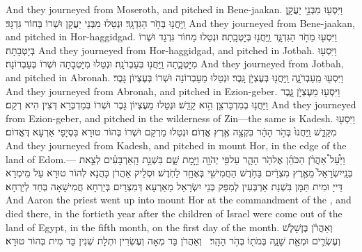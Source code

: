 {And they journeyed from Moseroth, and pitched in Bene-jaakan.}{}
{וַיִּסְע֖וּ מִבְּנֵ֣י יַעֲקָ֑ן וַֽיַּחֲנ֖וּ בְּחֹ֥ר הַגִּדְגָּֽד׃}
{וּנְטַלוּ מִבְּנֵי יַעֲקָן וּשְׁרוֹ בְּחוֹר גִּדְגָּד׃}
{And they journeyed from Bene-jaakan, and pitched in Hor-haggidgad.}{}
{וַיִּסְע֖וּ מֵחֹ֣ר הַגִּדְגָּ֑ד וַֽיַּחֲנ֖וּ בְּיׇטְבָֽתָה׃}
{וּנְטַלוּ מֵחוֹר גִּדְגָד וּשְׁרוֹ בְּיָטְבָתָה׃}
{And they journeyed from Hor-haggidgad, and pitched in Jotbah.}{}
{וַיִּסְע֖וּ מִיׇּטְבָ֑תָה וַֽיַּחֲנ֖וּ בְּעַבְרֹנָֽה׃}
{וּנְטַלוּ מִיָּטְבָתָה וּשְׁרוֹ בְּעַבְרוֹנָה׃}
{And they journeyed from Jotbah, and pitched in Abronah.}{}
{וַיִּסְע֖וּ מֵֽעַבְרֹנָ֑ה וַֽיַּחֲנ֖וּ בְּעֶצְיֹ֥ן גָּֽבֶר׃}
{וּנְטַלוּ מֵעַבְרוֹנָה וּשְׁרוֹ בְּעֶצְיוֹן גָּבֶר׃}
{And they journeyed from Abronah, and pitched in Ezion-geber.}{}
{וַיִּסְע֖וּ מֵעֶצְיֹ֣ן גָּ֑בֶר וַיַּחֲנ֥וּ בְמִדְבַּר\maqqaf צִ֖ן הִ֥וא קָדֵֽשׁ׃}
{וּנְטַלוּ מֵעֶצְיוֹן גָּבֶר וּשְׁרוֹ בְּמַדְבְּרָא דְּצִין הִיא רְקַם׃}
{And they journeyed from Ezion-geber, and pitched in the wilderness of Zin—the same is Kadesh.}{}
{וַיִּסְע֖וּ מִקָּדֵ֑שׁ וַֽיַּחֲנוּ֙ בְּהֹ֣ר הָהָ֔ר בִּקְצֵ֖ה אֶ֥רֶץ אֱדֽוֹם׃}
{וּנְטַלוּ מֵרְקַם וּשְׁרוֹ בְּהוֹר טוּרָא בִּסְיָפֵי אַרְעָא דֶּאֱדוֹם׃}
{And they journeyed from Kadesh, and pitched in mount Hor, in the edge of the land of Edom.—}{}
{וַיַּ֩עַל֩ אַהֲרֹ֨ן הַכֹּהֵ֜ן אֶל\maqqaf הֹ֥ר הָהָ֛ר עַל\maqqaf פִּ֥י יְהֹוָ֖ה וַיָּ֣מׇת שָׁ֑ם בִּשְׁנַ֣ת הָֽאַרְבָּעִ֗ים לְצֵ֤את בְּנֵֽי\maqqaf יִשְׂרָאֵל֙ מֵאֶ֣רֶץ מִצְרַ֔יִם בַּחֹ֥דֶשׁ הַחֲמִישִׁ֖י בְּאֶחָ֥ד לַחֹֽדֶשׁ׃}
{וּסְלֵיק אַהֲרֹן כָּהֲנָא לְהוֹר טוּרָא עַל מֵימְרָא דַּייָ וּמִית תַּמָּן בִּשְׁנַת אַרְבְּעִין לְמִפַּק בְּנֵי יִשְׂרָאֵל מֵאַרְעָא דְּמִצְרַיִם בְּיַרְחָא חֲמִישָׁאָה בְּחַד לְיַרְחָא׃}
{And Aaron the priest went up into mount Hor at the commandment of the \lord, and died there, in the fortieth year after the children of Israel were come out of the land of Egypt, in the fifth month, on the first day of the month.}{}
{וְאַהֲרֹ֔ן בֶּן\maqqaf שָׁלֹ֧שׁ וְעֶשְׂרִ֛ים וּמְאַ֖ת שָׁנָ֑ה בְּמֹת֖וֹ בְּהֹ֥ר הָהָֽר׃ \setuma }
{וְאַהֲרֹן בַּר מְאָה וְעֶשְׂרִין וּתְלָת שְׁנִין כַּד מִית בְּהוֹר טוּרָא׃}
